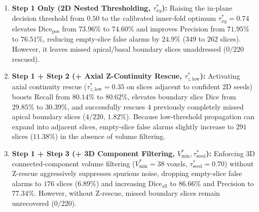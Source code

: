 \documentclass[11pt,a4paper]{article}
\begin{document}
\begin{enumerate}
\item \textbf{Step 1 Only (2D Nested Thresholding, $\tau_{xy}^*$):} Raising the in-plane decision threshold from $0.50$ to the calibrated inner-fold optimum $\tau_{xy}^* = 0.74$ elevates $\text{Dice}_{\text{pos}}$ from $73.96\%$ to $74.60\%$ and improves Precision from $71.95\%$ to $76.51\%$, reducing empty-slice false alarms by $24.9\%$ ($349$ to $262$ slices). However, it leaves missed apical/basal boundary slices unaddressed ($0 / 220$ rescued).
\item \textbf{Step 1 + Step 2 (+ Axial Z-Continuity Rescue, $\tau_{z,\mathrm{low}}^*$):} Activating axial continuity rescue ($\tau_{z,\mathrm{low}}^* = 0.35$ on slices adjacent to confident 2D seeds) boosts Recall from $80.14\%$ to $80.62\%$, elevates boundary slice Dice from $29.85\%$ to $30.39\%$, and successfully rescues $4$ previously completely missed apical boundary slices ($4 / 220$, $1.82\%$). Because low-threshold propagation can expand into adjacent slices, empty-slice false alarms slightly increase to $291$ slices ($11.38\%$) in the absence of volume filtering.
\item \textbf{Step 1 + Step 3 (+ 3D Component Filtering, $V_{\min}^*, \tau_{\mathrm{seed}}^*$):} Enforcing 3D connected-component volume filtering ($V_{\min}^* = 38$ voxels, $\tau_{\mathrm{seed}}^* = 0.70$) without Z-rescue aggressively suppresses spurious noise, dropping empty-slice false alarms to $176$ slices ($6.89\%$) and increasing $\text{Dice}_{\text{all}}$ to $86.66\%$ and Precision to $77.34\%$. However, without Z-rescue, missed boundary slices remain unrecovered ($0 / 220$).

\end{enumerate}
\end{document}
